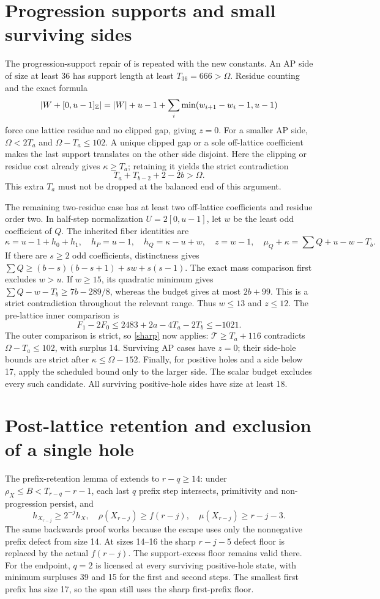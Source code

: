 \documentclass[11pt,a4paper]{article}
\newcommand{\T}{\mathcal T}
\begin{document}
\section{Progression supports and small surviving sides}
The progression-support repair of \cite{schedule,previous} is repeated
with the new constants. An AP side of size at least 36 has support length
at least $T_{36}=666>\Omega$. Residue counting and the exact formula
\[
 |W+[0,u-1]_{\mathbb Z}|=|W|+u-1+
       \sum_i\min(w_{i+1}-w_i-1,u-1)
\]
force one lattice residue and no clipped gap, giving $z=0$.
For a smaller AP side, $\Omega<2T_a$ and $\Omega-T_a\le102$.
A unique clipped gap or a sole off-lattice coefficient makes the last
support translates on the other side disjoint. Here the clipping or
residue cost already gives $\kappa\ge T_a$; retaining it yields the
strict contradiction
\[
 T_a+T_{b-2}+2-2b>\Omega.
\]
This extra $T_a$ must not be dropped at the balanced end of this argument.

The remaining two-residue case has at least two off-lattice coefficients
and residue order two. In half-step normalization $U=2[0,u-1]$, let
$w$ be the least odd coefficient of $Q$. The inherited fiber identities are
\[
 \kappa=u-1+h_0+h_1,\quad h_P=u-1,\quad
 h_Q=\kappa-u+w,\quad z=w-1,
 \quad\mu_Q+\kappa=\sum Q+u-w-T_b.
\]
If there are $s\ge2$ odd coefficients, distinctness gives
$\sum Q\ge(b-s)(b-s+1)+sw+s(s-1)$.
The exact mass comparison first excludes $w>u$. If $w\ge15$, its quadratic
minimum gives $\sum Q-w-T_b\ge7b-289/8$, whereas the budget gives
at most $2b+99$. This is a strict contradiction throughout the relevant
range. Thus $w\le13$ and $z\le12$.
The pre-lattice inner comparison is
\[
 F_1-2F_0\le2483+2a-4T_a-2T_b\le-1021.
\]
The outer comparison is strict, so \eqref{sharp} now applies:
$\T\ge T_a+116$ contradicts $\Omega-T_a\le102$, with surplus 14.
Surviving AP cases have $z=0$; their side-hole bounds are strict after
$\kappa\le\Omega-152$. Finally, for positive holes and a side below 17,
apply the scheduled bound only to the larger side. The scalar budget
excludes every such candidate. All surviving positive-hole sides have
size at least 18.

\section{Post-lattice retention and exclusion of a single hole}
The prefix-retention lemma of \cite{previous} extends to $r-q\ge14$:
under $\rho_X\le B<T_{r-q}-r-1$, each last $q$ prefix step intersects,
primitivity and non-progression persist, and
\[
 h_{X_{r-j}}\ge2^{-j}h_X,\quad
 \rho(X_{r-j})\ge f(r-j),\quad\mu(X_{r-j})\ge r-j-3.
\]
The same backwards proof works because the escape uses only the
nonnegative prefix defect from size 14. At sizes 14--16 the sharp
$r-j-5$ defect floor is replaced by the actual $f(r-j)$.
The support-excess floor remains valid there. For the endpoint,
$q=2$ is licensed at every surviving positive-hole state, with minimum
surpluses 39 and 15 for the first and second steps. The smallest first
prefix has size 17, so the span still uses the sharp first-prefix floor.
\end{document}
